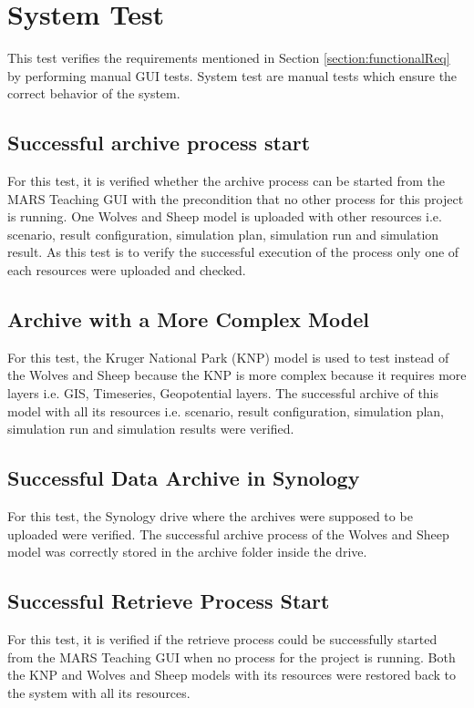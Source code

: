 \section{System Test}
This test verifies the requirements mentioned in Section \ref{section:functionalReq} by performing manual GUI tests. System test are manual tests
which ensure the correct behavior of the system.

\subsection{Successful archive process start}
For this test, it is verified whether the archive process can be started from the MARS Teaching GUI with the precondition that no other process
for this project is running. One Wolves and Sheep model is uploaded with other resources i.e. scenario, result configuration,
simulation plan, simulation run and simulation result. As this test is to verify the successful execution of the process only one of each resources
were uploaded and checked.

\subsection{Archive with a More Complex Model}
For this test, the Kruger National Park (KNP) model is used to test instead of the Wolves and Sheep because the KNP is more complex because it requires more layers
i.e. GIS, Timeseries, Geopotential layers. The successful archive of this model with all its resources i.e. scenario, result configuration, simulation plan, simulation run
and simulation results were verified. 

\subsection{Successful Data Archive in Synology}
For this test, the Synology drive where the archives were supposed to be uploaded were verified. The successful archive process of the Wolves and Sheep model
was correctly stored in the archive folder inside the drive.

\subsection{Successful Retrieve Process Start}
For this test, it is verified if the retrieve process could be successfully started from the MARS Teaching GUI when no process for the project is running.
Both the KNP and Wolves and Sheep models with its resources were restored back to the system with all its resources. 

